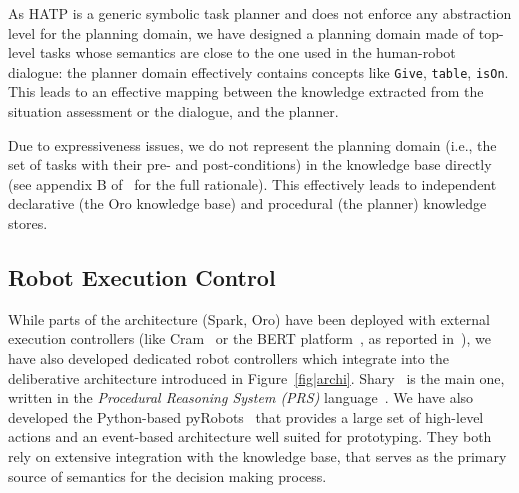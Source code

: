\documentclass[preprint,3p,times]{elsarticle}
\newcommand{\ie}{i.e.\xspace}
\begin{document}
%
%
%

As HATP is a generic symbolic task planner and does not enforce any abstraction
level for the planning domain, we have designed a planning domain made of
top-level tasks whose semantics are close to the one used in the human-robot
dialogue: the planner domain effectively contains concepts like \texttt{Give},
\texttt{table}, \texttt{isOn}. This leads to an effective mapping between the
knowledge extracted from the situation assessment or the dialogue, and the
planner.

Due to expressiveness issues, we do not represent the planning domain (\ie, the set of tasks with their pre- and
post-conditions) in the knowledge base directly (see
appendix B of~\cite{Lemaignan2012a} for the full rationale). This effectively
leads to independent declarative (the {\sc Oro} knowledge base) and procedural
(the planner) knowledge stores.

\subsection{Robot Execution Control}
\label{sect|ctrl}

While parts of the architecture ({\sc Spark}, {\sc Oro}) have been deployed with
external execution controllers (like {\sc Cram}~\cite{Beetz2010} or the BERT
platform~\cite{Lallee2010b}, as reported in~\cite{Lemaignan2010}), we have also
developed dedicated robot controllers which integrate into the deliberative
architecture introduced
in Figure~\ref{fig|archi}. {\sc Shary}~\cite{clodic2009} is the main one,
written in the \emph{Procedural Reasoning System (PRS)} language~\cite{Ingrand1996}.
We have also developed the Python-based {\sc pyRobots}~\cite{lemaignan2015pyrobots} that
provides a large set of high-level actions and an event-based architecture well
suited for prototyping. They both rely on extensive integration with the knowledge
base, that serves as the primary source of semantics for the decision making process.
\end{document}
